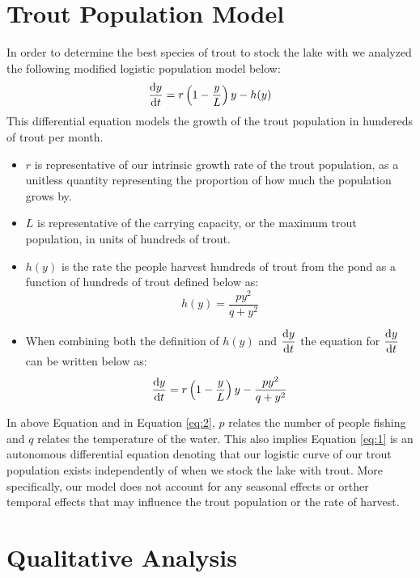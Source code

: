 \documentclass[letterpaper,12pt]{article}
\begin{document}
\section{Trout Population Model}
In order to determine the best species of trout to stock the lake with we analyzed the following modified logistic population model below:
\begin{equation} \label{eq:1}
    \dv{y}{t} = r\left(1 - \frac{y}{L}\right)y - h(y)
\end{equation}
This differential equation models the growth of the trout population in hundereds of trout per month. 
\begin{itemize}
    \item \(r\) is representative of our intrinsic growth rate of the trout population, as a unitless quantity representing the proportion of how much the population grows by.
    \item \(L\) is representative of the carrying capacity, or the maximum trout population, in units of hundreds of trout.
    \item \(h(y)\) is the rate the people harvest hundreds of trout from the pond as a function of hundreds of trout defined below as:
\begin{equation} \label{eq:2}
    h(y) = \frac{py^2}{q + y^2}
\end{equation}
    \item When combining both the definition of \(h(y)\) and \(\displaystyle \dv{y}{t}\) the equation for \(\displaystyle \dv{y}{t}\) can be written below as:
\begin{equation*}
    \dv{y}{t} = r\left(1 - \frac{y}{L}\right)y - \frac{py^2}{q + y^2}
\end{equation*}
\end{itemize}
In above Equation and in Equation \eqref{eq:2}, \(p\) relates the number of people fishing and \(q\) relates the temperature of the water.
This also implies Equation \eqref{eq:1} is an autonomous differential equation denoting that our logistic curve of our trout population exists independently of when we stock the lake with trout. 
More specifically, our model does not account for any seasonal effects or orther temporal effects that may influence the trout population or the rate of harvest.
\section{Qualitative Analysis}
\end{document}
